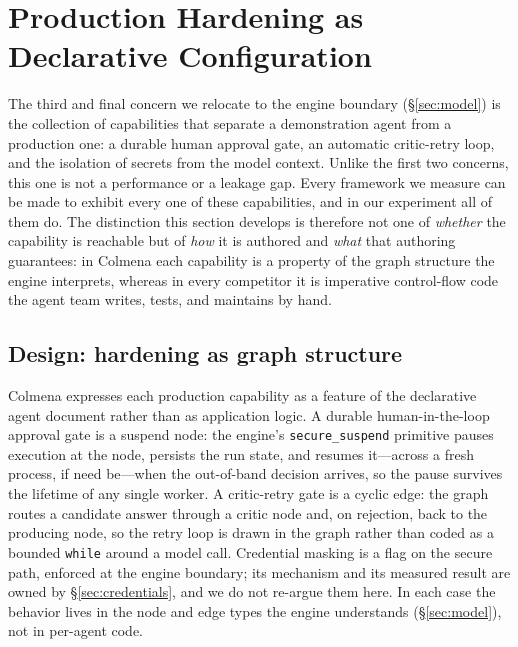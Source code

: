\section{Production Hardening as Declarative Configuration}
\label{sec:hardening}

\newcommand{\cmark}{\ensuremath{\bullet}}

The third and final concern we relocate to the engine boundary
(\S\ref{sec:model}) is the collection of capabilities that separate a
demonstration agent from a production one: a durable human approval gate,
an automatic critic-retry loop, and the isolation of secrets from the model
context. Unlike the first two concerns, this one is not a performance or a
leakage gap. Every framework we measure can be made to exhibit every one of
these capabilities, and in our experiment all of them do. The distinction
this section develops is therefore not one of \emph{whether} the capability
is reachable but of \emph{how} it is authored and \emph{what} that authoring
guarantees: in Colmena each capability is a property of the graph structure
the engine interprets, whereas in every competitor it is imperative
control-flow code the agent team writes, tests, and maintains by hand.

\subsection{Design: hardening as graph structure}
\label{subsec:hardening-design}

Colmena expresses each production capability as a feature of the declarative
agent document rather than as application logic. A durable human-in-the-loop
approval gate is a suspend node: the engine's \texttt{secure\_suspend}
primitive pauses execution at the node, persists the run state, and resumes
it---across a fresh process, if need be---when the out-of-band decision
arrives, so the pause survives the lifetime of any single worker. A
critic-retry gate is a cyclic edge: the graph routes a candidate answer
through a critic node and, on rejection, back to the producing node, so the
retry loop is drawn in the graph rather than coded as a bounded \texttt{while}
around a model call. Credential masking is a flag on the secure path,
enforced at the engine boundary; its mechanism and its measured result are
owned by \S\ref{sec:credentials}, and we do not re-argue them here. In each
case the behavior lives in the node and edge types the engine understands
(\S\ref{sec:model}), not in per-agent code.

